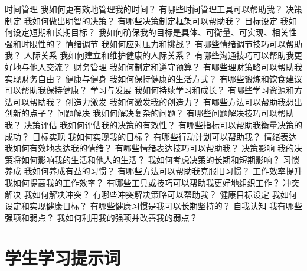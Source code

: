 \documentclass[12pt]{book}
\begin{document}
时间管理
我如何更有效地管理我的时间？
有哪些时间管理工具可以帮助我？
决策制定
我如何做出明智的决策？
有哪些决策制定框架可以帮助我？
目标设定
我如何设定短期和长期目标？
我如何确保我的目标是具体、可衡量、可实现、相关性强和时限性的？
情绪调节
我如何应对压力和挑战？
有哪些情绪调节技巧可以帮助我？
人际关系
我如何建立和维护健康的人际关系？
有哪些沟通技巧可以帮助我更好地与他人交流？
财务管理
我如何制定和遵守预算？
有哪些理财策略可以帮助我实现财务自由？
健康与健身
我如何保持健康的生活方式？
有哪些锻炼和饮食建议可以帮助我保持健康？
学习与发展
我如何持续学习和成长？
有哪些学习资源和方法可以帮助我？
创造力激发
我如何激发我的创造力？
有哪些方法可以帮助我想出创新的点子？
问题解决
我如何解决复杂的问题？
有哪些问题解决技巧可以帮助我？
决策评估
我如何评估我的决策的有效性？
有哪些指标可以帮助我衡量决策的成功？
目标实现
我如何实现我的目标？
有哪些行动计划可以帮助我？
情绪表达
我如何有效地表达我的情绪？
有哪些情绪表达技巧可以帮助我？
决策影响
我的决策将如何影响我的生活和他人的生活？
我如何考虑决策的长期和短期影响？
习惯养成
我如何养成有益的习惯？
有哪些方法可以帮助我克服旧习惯？
工作效率提升
我如何提高我的工作效率？
有哪些工具或技巧可以帮助我更好地组织工作？
冲突解决
我如何解决冲突？
有哪些冲突解决策略可以帮助我？
健康目标设定
我如何设定和实现健康目标？
有哪些健康习惯是我可以长期坚持的？
自我认知
我有哪些强项和弱点？
我如何利用我的强项并改善我的弱点？


\chapter{学生学习提示词}
\end{document}
